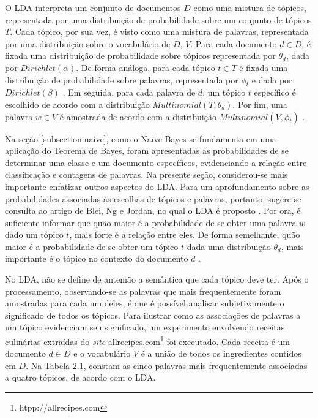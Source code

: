 O LDA interpreta um conjunto de documentos \ensuremath{D} como uma mistura de tópicos, representada por uma distribuição de probabilidade sobre um conjunto de tópicos \ensuremath{T}. Cada tópico, por sua vez, é visto como uma mistura de palavras, representada por uma distribuição sobre o vocabulário de \ensuremath{D}, \ensuremath{V}. Para cada documento \ensuremath{d \in D}, é fixada uma distribuição de probabilidade sobre tópicos  representada por \ensuremath{\theta_d}, dada por \ensuremath{Dirichlet(\alpha)}. De forma análoga, para cada tópico \ensuremath{t \in T} é fixada uma distribuição de probabilidade sobre palavras, representada por \ensuremath{\phi_t} e dada por \ensuremath{Dirichlet(\beta)} \cite{pnas}. Em seguida, para cada palavra de \ensuremath{d}, um tópico \ensuremath{t} específico é escolhido de acordo com a distribuição \ensuremath{Multinomial(T, \theta_d)}. Por fim, uma palavra \ensuremath{w \in V} é amostrada de acordo com a distribuição \ensuremath{Multinomial(V, \phi_t)} \cite{blei}.

Na seção \ref{subsection:naive}, como o Naïve Bayes se fundamenta em uma aplicação do Teorema de Bayes, foram apresentadas as probabilidades de se determinar uma classe e um documento específicos, evidenciando a relação entre classificação e contagens de palavras. Na presente seção, considerou-se mais importante enfatizar outros aspectos do LDA. Para um aprofundamento sobre as probabilidades associadas às escolhas de tópicos e palavras, portanto, sugere-se consulta ao artigo de Blei, Ng e Jordan, no qual o LDA é proposto \cite{blei}. Por ora, é suficiente informar que quão maior é a probabilidade de se obter uma palavra \ensuremath{w} dado um tópico \ensuremath{t}, mais forte é a relação entre eles. De forma semelhante, quão maior é a probabilidade de se obter um tópico \ensuremath{t} dada uma distribuição \ensuremath{\theta_d}, mais importante é o tópico no contexto do documento \ensuremath{d} \cite{pnas}.
 
No LDA, não se define de antemão a semântica que cada tópico deve ter. Após o processamento, observando-se as palavras que mais frequentemente foram amostradas para cada um deles, é que é possível analisar subjetivamente o significado de todos os tópicos. Para ilustrar como as associações de palavras a um tópico evidenciam seu significado, um experimento envolvendo receitas culinárias extraídas do \emph{site} allrecipes.com\footnote{htpp://allrecipes.com} foi executado. Cada receita é um documento \ensuremath{d \in D} e o vocabulário \ensuremath{V} é a união de todos os ingredientes contidos em \ensuremath{D}. Na Tabela 2.1, constam as cinco palavras mais frequentemente associadas a quatro tópicos, de acordo com o LDA. %

